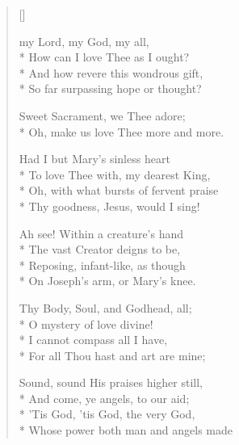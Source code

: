 \newHymn
{}

\begin{verse}[\versewidth]

 my Lord, my God, my all,\\*
How can I love Thee as I ought?\\*
And how revere this wondrous gift,\\*
So far surpassing hope or
thought?

\begin{indentedVerse}
 \vin Sweet Sacrament, we Thee adore;\\*
\vin Oh, make us love Thee more and more. 
\end{indentedVerse}

 Had I but Mary's sinless heart\\*
To love Thee with, my dearest King,\\*
Oh, with what bursts of fervent praise\\*
Thy goodness, Jesus, would I sing!


 Ah see! Within a creature's hand\\*
The vast Creator deigns to be,\\*
Reposing, infant-like, as though\\*
On Joseph’s arm, or Mary’s knee.


 Thy Body, Soul, and Godhead, all;\\*
O mystery of love divine!\\*
I cannot compass all I have,\\*
For all Thou hast and art are mine; 


 Sound, sound His praises higher still,\\*
And come, ye angels, to our aid;\\*
'Tis God, 'tis God, the very God,\\*
Whose power both man and angels made

\end{verse}

